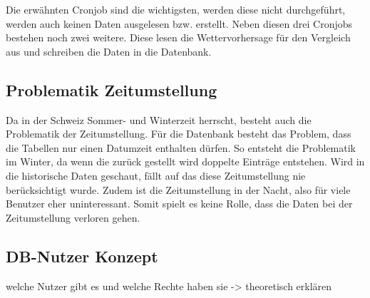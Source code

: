 Die erwähnten Cronjob sind die wichtigsten, werden diese nicht durchgeführt, werden auch keinen Daten ausgelesen bzw. erstellt. Neben diesen drei Cronjobs bestehen noch zwei weitere. Diese lesen die Wettervorhersage für den Vergleich aus und schreiben die Daten in die Datenbank.

\subsection{Problematik Zeitumstellung}
Da in der Schweiz Sommer- und Winterzeit herrscht, besteht auch die Problematik der Zeitumstellung. Für die Datenbank besteht das Problem, dass die Tabellen nur einen Datumzeit enthalten dürfen. So entsteht die Problematik im Winter, da wenn die zurück gestellt wird doppelte Einträge entstehen. Wird in die historische Daten geschaut, fällt auf das diese Zeitumstellung nie berücksichtigt wurde. Zudem ist die Zeitumstellung in der Nacht, also für viele Benutzer eher uninteressant. Somit spielt es keine Rolle, dass die Daten bei der Zeitumstellung verloren gehen.




\subsection{DB-Nutzer Konzept}
welche Nutzer gibt es und welche Rechte haben sie -> theoretisch erklären
